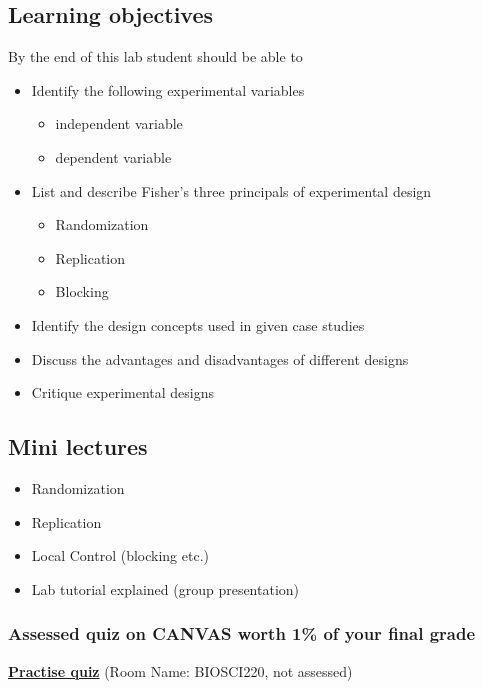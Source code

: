 \documentclass{article}
\begin{document}
\subsection*{Learning objectives}
By the end of this lab student should be able to
\begin{itemize}
\item Identify the following experimental variables
  \begin{itemize}
      \item independent variable
      \item dependent variable
        \end{itemize}
\item List and describe Fisher's three principals of experimental design
  \begin{itemize}
       \item Randomization
       \item Replication
       \item Blocking
       \end{itemize}  
   \item Identify the design concepts used in given case studies
   \item Discuss the advantages and disadvantages of different designs
   \item Critique experimental designs
\end{itemize}

\subsection*{Mini lectures}

\begin{itemize}
\item Randomization
\item Replication
\item Local Control (blocking etc.)
\item Lab tutorial explained (group presentation)
\end{itemize}

\subsubsection*{Assessed quiz on CANVAS worth 1\% of your final grade}

\begin{center}
  \href{https://b.socrative.com/login/student/}{\textbf{\Large Practise quiz}} (Room Name: BIOSCI220, not assessed)
  
\end{center}
\end{document}
